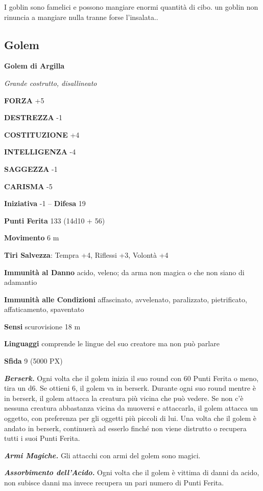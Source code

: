 \begin{multicols}{2}
I goblin sono famelici e possono mangiare enormi quantità di cibo. un goblin non rinuncia a mangiare nulla tranne forse l'insalata..


\subsection{Golem}

\medskip{}\textbf{Golem di Argilla}

\textit{Grande costrutto, disallineato}

\textbf{FORZA} +5

\textbf{DESTREZZA} -1

\textbf{COSTITUZIONE} +4

\textbf{INTELLIGENZA} -4

\textbf{SAGGEZZA} -1

\textbf{CARISMA} -5

\textbf{Iniziativa} -1 -- \textbf{Difesa} 19

\textbf{Punti Ferita} 133 (14d10 + 56)

\textbf{Movimento} 6 m

\textbf{Tiri Salvezza}: Tempra +4, Riflessi +3, Volontà +4

\textbf{Immunità al Danno} acido, veleno; da arma non magica o che non siano di adamantio

\textbf{Immunità alle Condizioni} affascinato, avvelenato, paralizzato, pietrificato, affaticamento, spaventato

\textbf{Sensi} scurovisione 18 m

\textbf{Linguaggi} comprende le lingue del suo creatore ma non può parlare

\textbf{Sfida} 9 (5000 PX)

\textit{\textbf{Berserk.}} Ogni volta che il golem inizia il suo round con 60 Punti Ferita o meno, tira un d6. Se ottieni 6, il golem va in berserk. Durante ogni suo round mentre è in berserk, il golem attacca la creatura più vicina che può vedere. Se non c'è nessuna creatura abbastanza vicina da muoversi e attaccarla, il golem attacca un oggetto, con preferenza per gli oggetti più piccoli di lui. Una volta che il golem è andato in berserk, continuerà ad esserlo finché non viene distrutto o recupera tutti i suoi Punti Ferita.

\textit{\textbf{Armi Magiche.}} Gli attacchi con armi del golem sono magici.

\textit{\textbf{Assorbimento dell'Acido.}} Ogni volta che il golem è vittima di danni da acido, non subisce danni ma invece recupera un pari numero di Punti Ferita.


\end{multicols}
